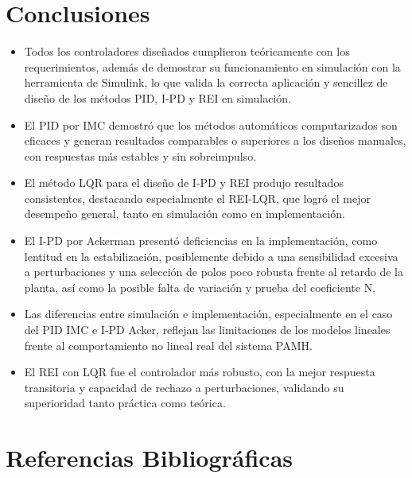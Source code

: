 \documentclass[conference,onecolumn,12pt]{IEEEtran}
\numberwithin{equation}{subsection}
\begin{document}
\section{Conclusiones}
\begin{itemize}
\item Todos los controladores diseñados cumplieron teóricamente con los requerimientos, además de demostrar su funcionamiento en simulación con la herramienta de Simulink, lo que valida la correcta aplicación y sencillez de diseño de los métodos PID, I-PD y REI en simulación.

\item El PID por IMC demostró que los métodos automáticos computarizados son eficaces y generan resultados comparables o superiores a los diseños manuales, con respuestas más estables y sin sobreimpulso.

\item El método LQR para el diseño de I-PD y REI produjo resultados consistentes, destacando especialmente el REI-LQR, que logró el mejor desempeño general, tanto en simulación como en implementación.

\item El I-PD por Ackerman presentó deficiencias en la implementación, como lentitud en la estabilización, posiblemente debido a una sensibilidad excesiva a perturbaciones y una selección de polos poco robusta frente al retardo de la planta, así como la posible falta de variación y prueba del coeficiente N.

\item Las diferencias entre simulación e implementación, especialmente en el caso del PID IMC e I-PD Acker, reflejan las limitaciones de los modelos lineales frente al comportamiento no lineal real del sistema PAMH.

\item El REI con LQR fue el controlador más robusto, con la mejor respuesta transitoria y capacidad de rechazo a perturbaciones, validando su superioridad tanto práctica como teórica.
    
\end{itemize}

\section{Referencias Bibliográficas}
\printbibliography[heading=none]
\end{document}
